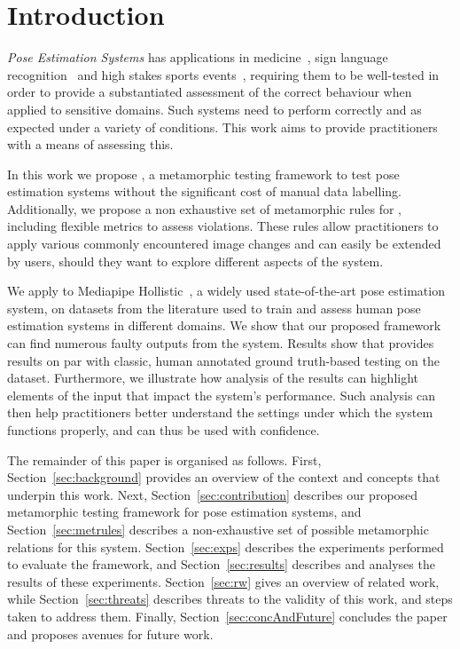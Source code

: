 \section{Introduction}
\label{sec:intro}
 \textit{Pose Estimation Systems} has applications in medicine~\cite{LITJENS201760}, sign language recognition~\cite{holmes2023scarcity} and high stakes sports events~\cite{martin2021automated},  requiring them to be well-tested in order to provide a substantiated assessment of the correct behaviour when applied to sensitive domains. Such systems need to perform correctly and as expected under a variety of conditions. This work aims to provide practitioners with a means of assessing this.

In this work we propose \proposed, a metamorphic testing framework to test pose estimation systems without the significant cost of manual data labelling. Additionally, we propose a non exhaustive set of metamorphic rules for \proposed, including flexible metrics to assess violations. These rules allow practitioners to apply various commonly encountered image changes and can easily be extended by users, should they want to explore different aspects of the system.

We apply \proposed to Mediapipe Hollistic~\cite{researchMediaPipeHolistic}, a widely used state-of-the-art pose estimation system, on datasets from the literature used to train and assess human pose estimation systems in different domains. We show that our proposed framework can find numerous faulty outputs from the system. Results show that \proposed provides results on par with classic, human annotated ground truth-based testing on the \FLIC dataset. Furthermore, we illustrate how analysis of the results can highlight elements of the input that impact the system's performance. Such analysis can then help practitioners better understand the settings under which the system functions properly, and can thus be used with confidence.

The remainder of this paper is organised as follows. First, Section~\ref{sec:background} provides an overview of the context and concepts that underpin this work. Next, Section~\ref{sec:contribution} describes our proposed metamorphic testing framework for pose estimation systems, and Section~\ref{sec:metrules} describes a non-exhaustive set of possible metamorphic relations for this system. Section~\ref{sec:exps} describes the experiments performed to evaluate the framework, and Section~\ref{sec:results} describes and analyses the results of these experiments. Section~\ref{sec:rw} gives an overview of related work, while Section~\ref{sec:threats} describes threats to the validity of this work, and steps taken to address them. Finally, Section~\ref{sec:concAndFuture} concludes the paper and proposes avenues for future work.